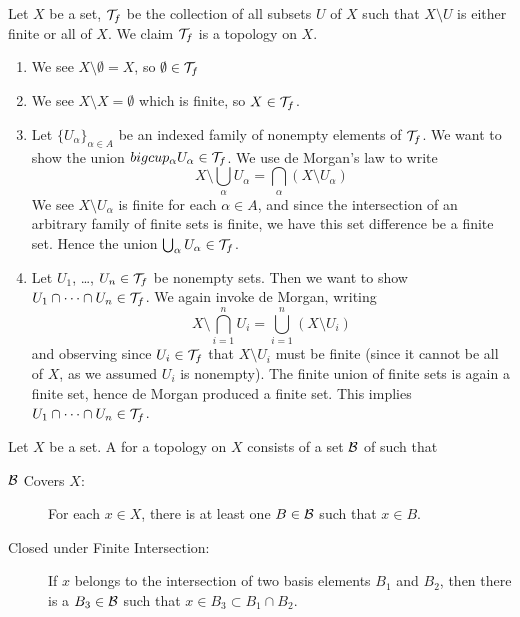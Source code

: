 Let $X$ be a set, $\mathcal{T}_{f}$ be the collection of all subsets
$U$ of $X$ such that $X\setminus U$ is either finite or all of $X$. We
claim $\mathcal{T}_{f}$ is a topology on $X$.
\begin{enumerate}
  \item We see $X\setminus\emptyset=X$, so
    $\emptyset\in\mathcal{T}_{f}$
  \item We see $X\setminus X=\emptyset$ which is finite, so
    $X\in\mathcal{T}_{f}$.
  \item Let $\{U_{\alpha}\}_{\alpha\in A}$ be an indexed family of
    nonempty elements of $\mathcal{T}_{f}$. We want to show the union
    $bigcup_{\alpha}U_{\alpha}\in\mathcal{T}_{f}$. We use de Morgan's
    law to write
    \begin{equation}
      X \setminus\bigcup_{\alpha}U_{\alpha} = \bigcap_{\alpha}(X\setminus U_{\alpha})
    \end{equation}
    We see $X\setminus U_{\alpha}$ is finite for each $\alpha\in A$,
    and since the intersection of an arbitrary family of finite sets is
    finite, we have this set difference be a finite set. Hence the union
    $\bigcup_{\alpha}U_{\alpha}\in\mathcal{T}_{f}$.
  \item Let $U_{1}$, \dots, $U_{n}\in\mathcal{T}_{f}$ be nonempty
    sets. Then we want to show $U_{1}\cap\dots\cap U_{n}\in\mathcal{T}_{f}$.
    We again invoke de Morgan, writing
    \begin{equation}
      X\setminus \bigcap^{n}_{i=1}U_{i}=\bigcup^{n}_{i=1}(X\setminus U_{i})
    \end{equation}
    and observing since $U_{i}\in\mathcal{T}_{f}$ that $X\setminus U_{i}$
    must be finite (since it cannot be all of $X$, as we assumed
    $U_{i}$ is nonempty). The finite union of finite sets is again a
    finite set, hence de Morgan produced a finite set. This implies
    $U_{1}\cap\dots\cap U_{n}\in\mathcal{T}_{f}$.
\end{enumerate}
\begin{defn}
  Let $X$ be a set. A  for a topology on $X$ consists of a
  set $\mathcal{B}$ of  such that
  \begin{description}
    \item[$\mathcal{B}$ Covers $X$:] For each $x\in X$, there is at
      least one $B\in\mathcal{B}$ such that $x\in B$.
    \item[Closed under Finite Intersection:]
      If $x$ belongs to the intersection of two basis elements $B_{1}$
      and $B_{2}$, then there is a $B_{3}\in\mathcal{B}$ such that
      $x\in B_{3}\subset B_{1}\cap B_{2}$.
  \end{description}
\end{defn}
